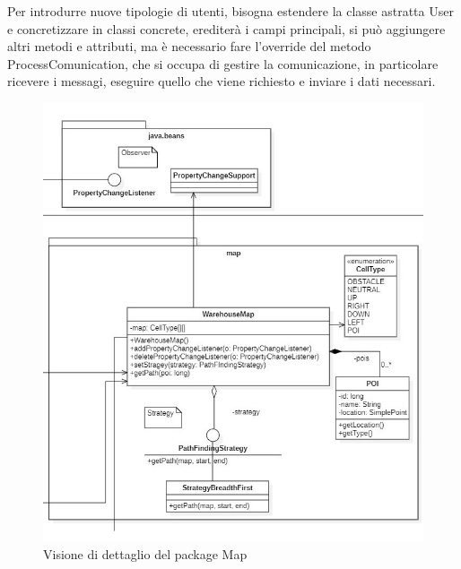         Per introdurre nuove tipologie di utenti, bisogna estendere la classe astratta User e concretizzare in classi concrete, erediterà i campi principali, si può aggiungere altri metodi e attributi, ma è necessario fare l'override del metodo ProcessComunication, che si occupa di gestire la comunicazione, in particolare ricevere i messagi, eseguire quello che viene richiesto e inviare i dati necessari.


\clearpage
{}

\begin{figure}[H]
	\centering
	\includegraphics[scale=0.60]{res/diagrams/server/server_pack_map.jpg}
	\caption{Visione di dettaglio del package Map}
\end{figure}


